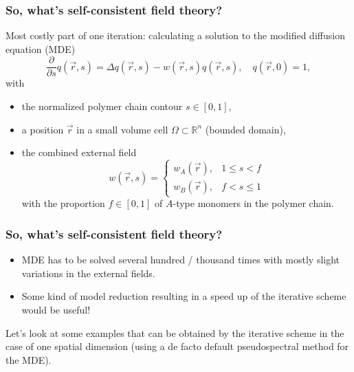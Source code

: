 \begin{frame}[t]
    \frametitle{So, what's self-consistent field theory?}

    Most costly part of one iteration:
    calculating a solution to the modified diffusion equation (MDE)
        \begin{equation}
            \frac{\partial}{\partial s}q(\vec{r}, s) = \Delta q(\vec{r}, s) - w(\vec{r}, s)q(\vec{r}, s), \quad q(\vec{r}, 0) = 1,
        \end{equation}
    with
    \begin{itemize}
        \item the normalized polymer chain contour $s \in [0, 1]$,
        \item a position $\vec{r}$ in a small volume cell $\Omega \subset \mathbb{R}^{n}$ (bounded domain),
        \item the combined external field
        \begin{equation}
            w(\vec{r}, s) = \begin{cases}
                w_{A}(\vec{r}), & 1 \leq s < f \\
                w_{B}(\vec{r}), & f < s \leq 1
            \end{cases}
        \end{equation}
        with the proportion $f \in [0, 1]$ of $A$-type monomers in the polymer chain.
    \end{itemize}
\end{frame}

\begin{frame}[t]
    \frametitle{So, what's self-consistent field theory?}

    \vfill

    \begin{itemize}
        \item MDE has to be solved several hundred / thousand times with mostly slight variations in the external fields.
        \item {} Some kind of model reduction resulting in a speed up of the iterative scheme would be useful!
    \end{itemize}

    \vfill
    Let's look at some examples that can be obtained by the iterative scheme in the case of one spatial dimension
    (using a de facto default pseudospectral method for the MDE).
    \vfill
\end{frame}

